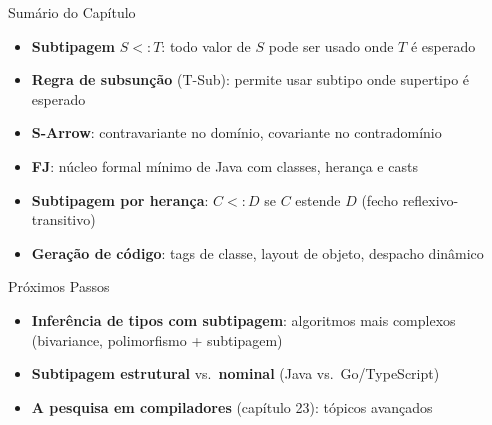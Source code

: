 \begin{frame}{Sumário do Capítulo}

    \begin{itemize}

        \item
        \textbf{Subtipagem} \(S <: T\): todo valor de \(S\) pode ser usado
        onde \(T\) é esperado
        \item
        \textbf{Regra de subsunção} (T-Sub): permite usar subtipo onde
        supertipo é esperado
        \item
        \textbf{S-Arrow}: contravariante no domínio, covariante no
        contradomínio
        \item
        \textbf{FJ}: núcleo formal mínimo de Java com classes, herança e casts
        \item
        \textbf{Subtipagem por herança}: \(C <: D\) se \(C\) estende \(D\)
        (fecho reflexivo-transitivo)
        \item
        \textbf{Geração de código}: tags de classe, layout de objeto, despacho
        dinâmico
    \end{itemize}
\end{frame}

\begin{frame}{Próximos Passos}

    \begin{itemize}

        \item
        \textbf{Inferência de tipos com subtipagem}: algoritmos mais complexos
        (bivariance, polimorfismo + subtipagem)
        \item
        \textbf{Subtipagem estrutural} vs.~\textbf{nominal} (Java
        vs.~Go/TypeScript)
        \item
        \textbf{A pesquisa em compiladores} (capítulo 23): tópicos avançados
    \end{itemize}
\end{frame}
